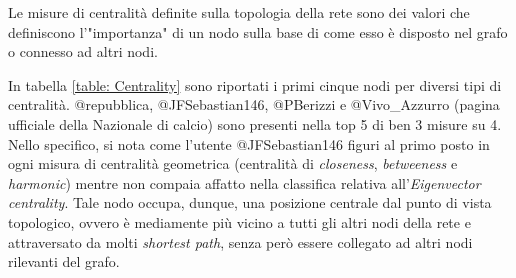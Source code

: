         \begin{table}
        \centering
        \caption{Nodi con il punteggio più alto per varie centralità.}
        \label{table: Centrality}
    \end{table}
        
        Le misure di centralità definite sulla topologia della rete sono dei valori che definiscono l’"importanza" di un nodo sulla base di come esso è disposto nel grafo o connesso ad altri nodi. 
        
        In tabella \ref{table: Centrality} sono riportati i primi cinque nodi per diversi tipi di centralità. @repubblica, @JFSebastian146, @PBerizzi e @Vivo\_Azzurro (pagina ufficiale della Nazionale di calcio) sono presenti nella top 5 di ben 3 misure su 4. Nello specifico, si nota come l'utente @JFSebastian146 figuri al primo posto in ogni misura di centralità geometrica (centralità di \textit{closeness}, \textit{betweeness} e \textit{harmonic}) mentre non compaia affatto nella classifica relativa all'\textit{Eigenvector centrality}. Tale nodo occupa, dunque, una posizione centrale dal punto di vista topologico, ovvero è mediamente più vicino a tutti gli altri nodi della rete e attraversato da molti \textit{shortest path}, senza però essere collegato ad altri nodi rilevanti del grafo.
        
